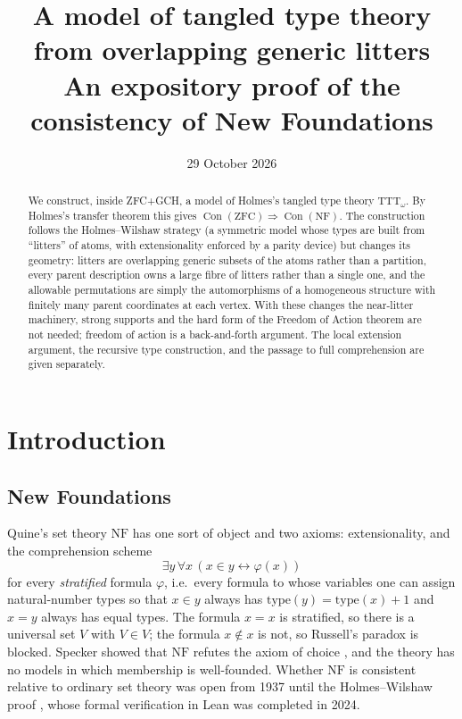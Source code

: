 \documentclass[11pt]{article}
\title{A model of tangled type theory\\from overlapping generic litters\\[4pt]
\large An expository proof of the consistency of New Foundations}
\author{}
\date{29 October 2026}
\theoremstyle{definition}
\theoremstyle{remark}
\newcommand{\NF}{\mathrm{NF}}
\newcommand{\TTT}{\mathrm{TTT}}
\newcommand{\Con}{\operatorname{Con}}
\begin{document}
\maketitle

\begin{abstract}
We construct, inside ZFC+GCH, a model of Holmes's tangled type theory
\(\TTT_\omega\). By Holmes's transfer theorem this gives
\(\Con(\mathrm{ZFC})\Rightarrow\Con(\NF)\). The construction follows the
Holmes--Wilshaw strategy (a symmetric model whose types are built from
``litters'' of atoms, with extensionality enforced by a parity device) but
changes its geometry: litters are overlapping generic subsets of the atoms
rather than a partition, every parent description owns a large fibre of
litters rather than a single one, and the allowable permutations are
simply the automorphisms of a homogeneous structure with finitely many
parent coordinates at each vertex. With these changes the near-litter machinery, strong
supports and the hard form of the Freedom of Action theorem are not
needed; freedom of action is a back-and-forth argument. The local extension argument, the recursive type construction, and the
passage to full comprehension are given separately.
\end{abstract}

\tableofcontents

\section{Introduction}

\subsection{New Foundations}
Quine's set theory \(\NF\) \cite{Quine} has one sort of object and two
axioms: extensionality, and the comprehension scheme
\[
 \exists y\,\forall x\,(x\in y\leftrightarrow\varphi(x))
\]
for every \emph{stratified} formula \(\varphi\), i.e.\ every formula to
whose variables one can assign natural-number types so that \(x\in y\)
always has \(\mathrm{type}(y)=\mathrm{type}(x)+1\) and \(x=y\) always has
equal types. The formula \(x=x\) is stratified, so there is a universal
set \(V\) with \(V\in V\); the formula \(x\notin x\) is not, so Russell's
paradox is blocked. Specker showed that \(\NF\) refutes the axiom of
choice \cite{Specker53}, and the theory has no models in which membership
is well-founded. Whether \(\NF\) is consistent relative to ordinary set
theory was open from 1937 until the Holmes--Wilshaw proof
\cite{HW}, whose formal verification in Lean was completed in 2024.
\end{document}
